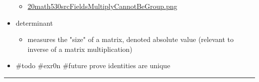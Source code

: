 \documentclass[letterpaper]{article}
\begin{document}
\begin{itemize}
\begin{itemize}
\item \href{20math530srcFieldsMultiplyCannotBeGroup.png.org}{20math530srcFieldsMultiplyCannotBeGroup.png}
\end{itemize}

\item determinant

\begin{itemize}
\item measures the "size" of a matrix, denoted absolute value (relevant to
inverse of a matrix multiplication)
\end{itemize}

\item \#todo \#exr0n \#future prove identities are unique
\end{itemize}

\noindent\rule{\textwidth}{0.5pt}
\end{document}
